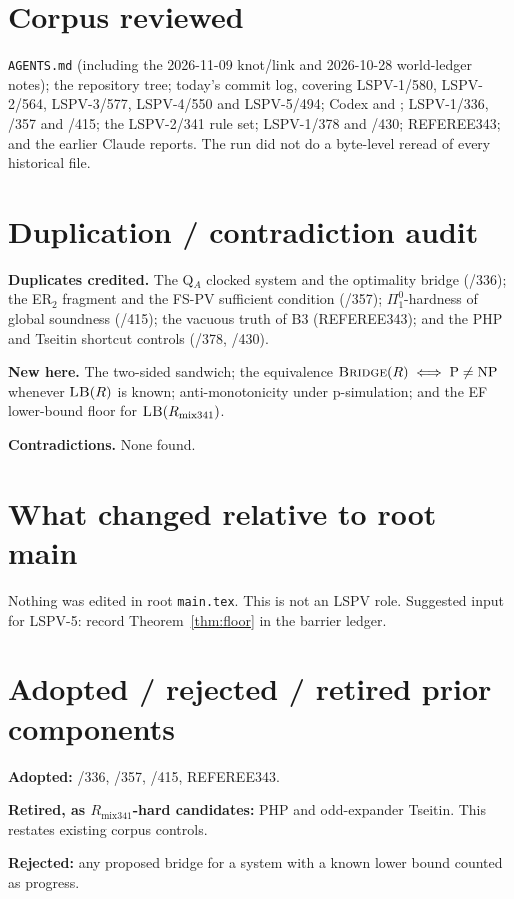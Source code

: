 \documentclass[11pt]{article}
\theoremstyle{remark}
\newcommand{\Rmix}{R_{\mathrm{mix341}}}
\begin{document}
\section*{Corpus reviewed}
\texttt{AGENTS.md} (including the 2026-11-09 knot/link and 2026-10-28 world-ledger notes); the
repository tree; today's commit log, covering LSPV-1/580, LSPV-2/564, LSPV-3/577, LSPV-4/550 and
LSPV-5/494; Codex  and
; LSPV-1/336, /357 and /415;
the LSPV-2/341 rule set; LSPV-1/378 and /430; REFEREE343; and the earlier Claude reports.
The run did not do a byte-level reread of every historical file.

\section*{Duplication / contradiction audit}
\textbf{Duplicates credited.} The Q$_A$ clocked system and the optimality bridge (/336); the
ER$_2$ fragment and the FS-PV sufficient condition (/357); $\Pi^0_1$-hardness of global soundness
(/415); the vacuous truth of B3 (REFEREE343); and the PHP and Tseitin shortcut controls (/378, /430).

\textbf{New here.} The two-sided sandwich; the equivalence $\textsc{Bridge}(R)\iff\mathrm P\ne\mathrm{NP}$
whenever $\textsc{LB}(R)$ is known; anti-monotonicity under p-simulation; and the EF lower-bound floor
for $\textsc{LB}(\Rmix)$.

\textbf{Contradictions.} None found.

\section*{What changed relative to root main}
Nothing was edited in root \texttt{main.tex}. This is not an LSPV role. Suggested input for
LSPV-5: record Theorem~\ref{thm:floor} in the barrier ledger.

\section*{Adopted / rejected / retired prior components}
\textbf{Adopted:} /336, /357, /415, REFEREE343.

\textbf{Retired, as $\Rmix$-hard candidates:} PHP and odd-expander Tseitin. This restates
existing corpus controls.

\textbf{Rejected:} any proposed bridge for a system with a known lower bound counted as progress.
\end{document}
